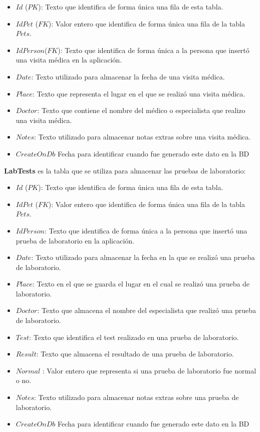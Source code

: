 \begin{itemize}
	\item	$Id$ ($PK$): Texto que identifica de forma única una fila de esta tabla.
	\item	$IdPet$ ($FK$): Valor entero que identifica de forma única una fila de la tabla $Pets$.
	\item	$IdPerson$($FK$): Texto que identifica de forma única a la persona que insertó una visita médica en la aplicación.
	\item	$Date$: Texto utilizado para almacenar la fecha de una visita médica.
	\item	$Place$: Texto que representa el lugar en el que se realizó una visita médica.
	\item	$Doctor$: Texto que contiene el nombre del médico o especialista que realizo una visita médica.
	\item	$Notes$: Texto utilizado para almacenar notas extras sobre una visita médica.
	\item	$CreateOnDb$ 
	Fecha para identificar cuando fue generado este dato en la BD
\end{itemize}

\textbf{LabTests} es la tabla que se utiliza para almacenar las pruebas de laboratorio:

\begin{itemize}
	\item	$Id$ ($PK$): Texto que identifica de forma única una fila de esta tabla.
	\item	$IdPet$ ($FK$): Valor entero que identifica de forma única una fila de la tabla $Pets$.
	\item	$IdPerson$: Texto que identifica de forma única a la persona que insertó una prueba de laboratorio en la aplicación.
	\item	$Date$: Texto utilizado para almacenar la fecha en la que se realizó una prueba de laboratorio.
	\item	$Place$: Texto en el que se guarda el lugar en el cual se realizó una prueba de laboratorio.
	\item	$Doctor$: Texto que almacena el nombre del especialista que realizó una prueba de laboratorio.
	\item	$Test$: Texto que identifica el test realizado en una prueba de laboratorio.
	\item	$Result$: Texto que almacena el resultado de una prueba de laboratorio.
	\item	$Normal$ : Valor entero que representa si una prueba de laboratorio fue normal o no.
	\item	$Notes$: Texto utilizado para almacenar notas extras sobre una prueba de laboratorio.
	\item	$CreateOnDb$ 
Fecha para identificar cuando fue generado este dato en la BD
\end{itemize}

